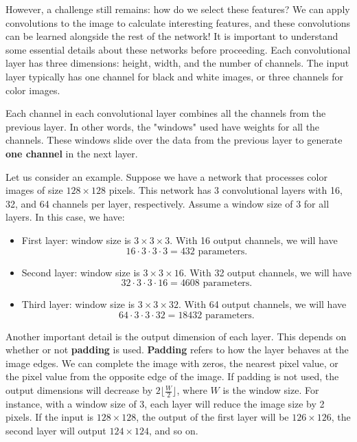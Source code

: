 However, a challenge still remains: how do we select these features? We can apply convolutions to the image to calculate interesting features, and these convolutions can be learned alongside the rest of the network! It is important to understand some essential details about these networks before proceeding. Each convolutional layer has three dimensions: height, width, and the number of channels. The input layer typically has one channel for black and white images, or three channels for color images.

Each channel in each convolutional layer combines all the channels from the previous layer. In other words, the "windows" used have weights for all the channels. These windows slide over the data from the previous layer to generate \textbf{one channel} in the next layer.

Let us consider an example. Suppose we have a network that processes color images of size \( 128 \times 128 \) pixels. This network has 3 convolutional layers with 16, 32, and 64 channels per layer, respectively. Assume a window size of 3 for all layers. In this case, we have:

\begin{itemize}
    \item First layer: window size is \( 3 \times 3 \times 3 \). With 16 output channels, we will have 
    \[
    16 \cdot 3 \cdot 3 \cdot 3 = 432 \text{ parameters.}
    \]
    \item Second layer: window size is \( 3 \times 3 \times 16 \). With 32 output channels, we will have 
    \[
    32 \cdot 3 \cdot 3 \cdot 16 = 4608 \text{ parameters.}
    \]
    \item Third layer: window size is \( 3 \times 3 \times 32 \). With 64 output channels, we will have 
    \[
    64 \cdot 3 \cdot 3 \cdot 32 = 18432 \text{ parameters.}
    \]
\end{itemize}


Another important detail is the output dimension of each layer. This depends on whether or not \textbf{padding} is used. \textbf{Padding} refers to how the layer behaves at the image edges. We can complete the image with zeros, the nearest pixel value, or the pixel value from the opposite edge of the image. If padding is not used, the output dimensions will decrease by \( 2 \lfloor \frac{W}{2} \rfloor \), where \( W \) is the window size. For instance, with a window size of 3, each layer will reduce the image size by 2 pixels. If the input is \( 128 \times 128 \), the output of the first layer will be \( 126 \times 126 \), the second layer will output \( 124 \times 124 \), and so on.

